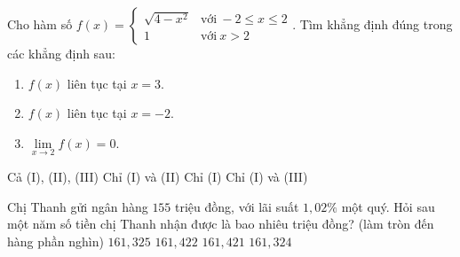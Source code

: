 \begin{ex}%
	Cho hàm số $f\left(x\right)=\begin{cases}
	\sqrt{4-x^2} &\text{với}\: -2\le x\le 2 \\ 
	1            &\text{với}\: x >2
	\end{cases}$. Tìm khẳng định đúng trong các khẳng định sau:%
	\begin{enumerate}[\bf (I).]
		\item $f(x)$ liên tục tại $x=3$.
		\item $f(x)$ liên tục tại $x=-2$.
		\item $\lim\limits_{x\to 2}f\left(x\right)=0$.
	\end{enumerate}
	\choice
	{Cả (I), (II), (III)}
	{Chỉ (I) và (II)}
	{\True Chỉ (I)}
	{Chỉ (I) và (III)}
\end{ex}
\begin{ex}%
	Chị Thanh gửi ngân hàng $155$ triệu đồng, với lãi suất $1,02\% $ một quý. Hỏi sau một năm số tiền chị Thanh nhận được là bao nhiêu triệu đồng? (làm tròn đến hàng phần nghìn)	
	\choice
	{$161,325$}
	{$161,422$}
	{\True $161,421$}
	{$161,324$}
\end{ex}
